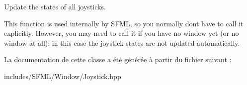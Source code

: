 Update the states of all joysticks. 

This function is used internally by S\+F\+ML, so you normally don\textquotesingle{}t have to call it explicitly. However, you may need to call it if you have no window yet (or no window at all)\+: in this case the joystick states are not updated automatically. 

La documentation de cette classe a été générée à partir du fichier suivant \+:\begin{DoxyCompactItemize}
\item 
includes/\+S\+F\+M\+L/\+Window/Joystick.\+hpp\end{DoxyCompactItemize}
